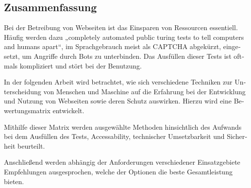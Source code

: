 \begin{otherlanguage}{ngerman}
	\chapter*{Zusammenfassung}
	Bei der Betreibung von Webseiten ist das Einsparen von Ressourcen essentiell. 
	Häufig werden dazu „completely automated public turing tests to tell computers and humans apart“, im Sprachgebrauch meist als CAPTCHA abgekürzt, eingesetzt, um Angriffe durch Bots zu unterbinden. 
	Das Ausfüllen dieser Tests ist oftmals kompliziert und stört bei der Benutzung.

	In der folgenden Arbeit wird betrachtet, wie sich verschiedene Techniken zur Unterscheidung von Menschen und Maschine auf die Erfahrung bei der Entwicklung und Nutzung von Webseiten sowie deren Schutz auswirken. 
	Hierzu wird eine Bewertungsmatrix entwickelt. 

	Mithilfe dieser Matrix werden ausgewählte Methoden hinsichtlich des Aufwands bei dem Ausfüllen des Tests, Accessability, technischer Umsetzbarkeit und Sicherheit beurteilt. 
	 
	Anschließend werden abhängig der Anforderungen verschiedener Einsatzgebiete Empfehlungen ausgesprochen, welche der Optionen die beste Gesamtleistung bieten.

\end{otherlanguage}
